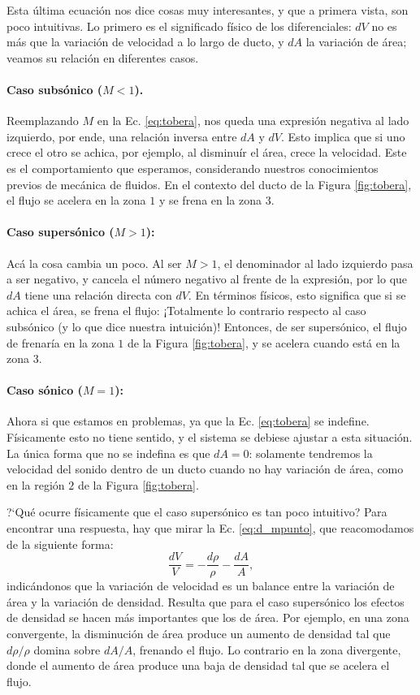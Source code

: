 Esta última ecuación nos dice cosas muy interesantes, y que a primera vista, son poco intuitivas.
Lo primero es el significado físico de los diferenciales: $dV$ no es más que la variación de velocidad a lo largo de ducto, y $dA$ la variación de área; veamos su relación en diferentes casos.
%
\paragraph*{Caso subsónico ($M<1$).} Reemplazando $M$ en la Ec. \eqref{eq:tobera}, nos queda una expresión negativa al lado izquierdo, por ende, una relación inversa entre $dA$ y $dV$.
Esto implica que si uno crece el otro se achica, por ejemplo, al disminuír el área, crece la velocidad.
Este es el comportamiento que esperamos, considerando nuestros conocimientos previos de mecánica de fluidos.
En el contexto del ducto de la Figura \ref{fig:tobera}, el flujo se acelera en la zona $1$ y se frena en la zona $3$.
%
\paragraph*{Caso supersónico ($M>1$):} Acá la cosa cambia un poco. Al ser $M>1$, el denominador al lado izquierdo pasa a ser negativo, y cancela el número negativo al frente de la expresión, por lo que $dA$ tiene una relación directa con $dV$.
En términos físicos, esto significa que si se achica el área, se frena el flujo: ¡Totalmente lo contrario respecto al caso subsónico (y lo que dice nuestra intuición)!
Entonces, de ser supersónico, el flujo de frenaría en la zona $1$ de la Figura \ref{fig:tobera}, y se acelera cuando está en la zona $3$.
%
\paragraph*{Caso sónico ($M=1$):} Ahora si que estamos en problemas, ya que la Ec. \eqref{eq:tobera} se indefine.
Físicamente esto no tiene sentido, y el sistema se debiese ajustar a esta situación.
La única forma que no se indefina es que $dA=0$: solamente tendremos la velocidad del sonido dentro de un ducto cuando no hay variación de área, como en la región $2$ de la Figura \ref{fig:tobera}.

\mbox{?`}Qué ocurre físicamente que el caso supersónico es tan poco intuitivo?
Para encontrar una respuesta, hay que mirar la Ec. \eqref{eq:d_mpunto}, que reacomodamos de la siguiente forma:
%
\begin{equation}
\frac{dV}{V} = -\frac{d\rho}{\rho} - \frac{dA}{A},
\end{equation}
%
indicándonos que la variación de velocidad es un balance entre la variación de área y la variación de densidad.
Resulta que para el caso supersónico los efectos de densidad se hacen más importantes que los de área.
Por ejemplo, en una zona convergente, la disminución de área produce un aumento de densidad tal que $d\rho/\rho$ domina sobre $dA/A$, frenando el flujo.
Lo contrario en la zona divergente, donde el aumento de área produce una baja de densidad tal que se acelera el flujo.

